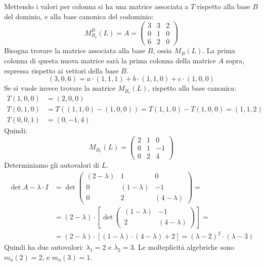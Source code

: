 \begin{exmp}
Mettendo i valori per colonna si ha una matrice associata a $T$ rispetto alla base $B$ del dominio, e alla base canonica del codominio:
\[
M_{B_c}^{B} (L) =
A = 
\begin{pmatrix}
3 & 3 & 2 \\
0 & 1 & 0 \\
6 & 2 & 0
\end{pmatrix}
\]
Bisogna trovare la matrice associata alla base $B$, ossia $M_{B} (L)$. La prima colonna di questa nuova matrice sar\`a la prima colonna della matrice $A$ sopra, espressa rispetto ai vettori della base $B$.
\[
(3,0,6) = a \cdot (1,1,1) + b \cdot (1,1,0) + c \cdot (1,0,0)
\]
Se si vuole invece trovare la matrice $M_{B_c} (L)$, rispetto alla base canonica:
\begin{align*}
T(1,0,0) &= (2,0,0) \\
T(0,1,0) &= T((1,1,0) - (1,0,0)) = T(1,1,0) - T(1,0,0) = (1,1,2) \\
T(0,0,1) &= (0,-1,4)
\end{align*}
Quindi:
\[
M_{B_c} (L) = 
\begin{pmatrix}
2 & 1 & 0 \\
0 & 1 & -1 \\
0 & 2 & 4
\end{pmatrix}
\]
Determiniamo gli autovalori di $L$.
\begin{align*}
\det{A - \lambda \cdot I} &= 
\det{
\begin{pmatrix}
(2- \lambda) & 1 & 0 \\
0 & (1 - \lambda) & -1 \\
0 & 2 & (4 - \lambda)
\end{pmatrix}
} = \\
&= (2 - \lambda) \cdot
\left[
\det{
\begin{pmatrix}
(1 - \lambda) & -1 \\
2 & (4 - \lambda)
\end{pmatrix}
}
\right] = \\
&= (2 - \lambda) \cdot \left[
(1 - \lambda) \cdot (4 - \lambda) + 2
\right] =
(\lambda - 2)^2 \cdot (\lambda - 3)
\end{align*}
Quindi ha due autovalori: $\lambda_1 = 2$ e $\lambda_2 = 3$. Le molteplicit\`a algebriche sono $m_a(2) = 2$, e $m_a(3) = 1$.


\end{exmp}
